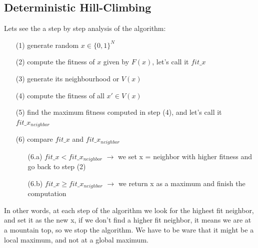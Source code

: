 \documentclass[a4paper]{article}
\begin{document}
\subsection{Deterministic Hill-Climbing}
Lets see the a step by step analysis of the algorithm:
\begin{itemize}
\item[(1)] generate random $x \in \{0,1\}^{N}$
\item[(2)] compute the fitness of $x$ given by $F(x)$, let's call it $fit\_x$
\item[(3)] generate its neighbourhood or $V(x)$
\item[(4)] compute the fitness of all $x' \in V(x)$
\item[(5)] find the maximum fitness computed in step (4), and let's call it $fit\_x_{neighbor}$
\item[(6)] compare $fit\_x$ and $fit\_x_{neighbor}$
\begin{itemize}
\item[(6.a)] $fit\_x < fit\_x_{neighbor}$ $\longrightarrow$ we set x = neighbor with higher fitness and go back to step (2)
\item[(6.b)] $fit\_x \geq fit\_x_{neighbor}$ $\longrightarrow$ we return x as a maximum and finish the computation
\end{itemize}
\end{itemize}
In other words, at each step of the algorithm we look for the highest fit neighbor, and set it as the new x, if we don't find a higher fit neighbor, it means we are at a mountain top, so we stop the algorithm. We have to be ware that it might be a local maximum, and not at a global maximum.
\end{document}
